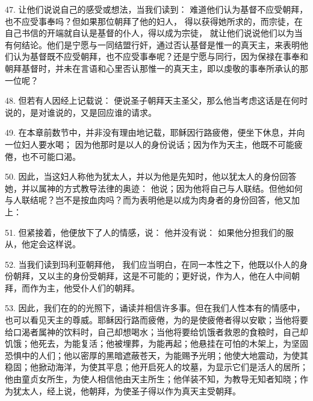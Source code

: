 47. 让他们说说自己的感受或想法，当我们读到：  难道他们认为基督不应受朝拜，也不应受事奉吗？但如果那位朝拜了他的妇人， 得以获得她所求的，而宗徒，在自己书信的开端就自认是基督的仆人，得以成为宗徒，  就让他们说说他们以为当有何结论。他们是宁愿与一同结盟行奸，通过否认基督是惟一的真天主，来表明他们认为基督既不应受朝拜，也不应受事奉呢？还是宁愿与同行，因为保禄在事奉和朝拜基督时，并未在言语和心里否认那惟一的真天主，即以虔敬的事奉所承认的那一位呢？\par

\par

48. 但若有人因经上记载说：  便说圣子朝拜天主圣父，那么他当考虑这话是在何时说的，是对谁说的，又是回应谁的请求。\par

49. 在本章前数节中，并非没有理由地记载，耶稣因行路疲倦，便坐下休息，并向一位妇人要水喝； 因为他那时是以人的身份说话；因为作为天主，他既不可能疲倦，也不可能口渴。\par

50. 因此，当这妇人称他为犹太人，并以为他是先知时，他以犹太人的身份回答她，并以属神的方式教导法律的奥迹： 他说；因为他将自己与人联结。但他如何与人联结呢？岂不是按血肉吗？而为表明他是以成为肉身者的身份回答，他又加上： \par

51. 但紧接着，他便放下了人的情感，说：  他并没有说： 如果他分担我们的服从，他定会这样说。\par

52. 当我们读到玛利亚朝拜他， 我们应当明白，在同一本性之下，他既以仆人的身份朝拜，又以主的身份受朝拜，这是不可能的；更好说，作为人，他在人中间朝拜，而作为主，他受仆人们的朝拜。\par

53. 因此，我们在的的光照下，诵读并相信许多事。但在我们人性本有的情感中，也可以看见天主的尊威。耶稣因行路而疲倦，为的是使疲倦者得以安歇；当他将要给口渴者属神的饮料时，自己却想喝水；当他将要给饥饿者救恩的食粮时，自己却饥饿；他死去，为能复活；他被埋葬，为能再起；他悬挂在可怕的木架上，为坚固恐惧中的人们；他以密厚的黑暗遮蔽苍天，为能赐予光明；他使大地震动，为使其稳固；他掀动海洋，为使其平息；他开启死人的坟墓，为显示它们是活人的居所；他由童贞女所生，为使人相信他由天主所生；他佯装不知，为教导无知者知晓；作为犹太人，经上说，他朝拜，为使圣子得以作为真天主受朝拜。\par

